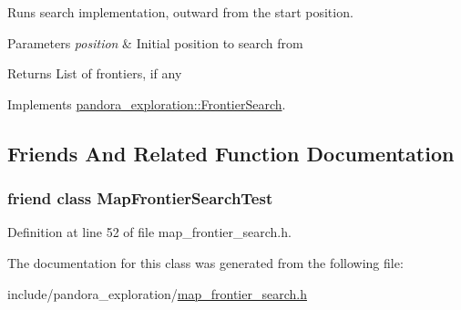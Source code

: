 \-Runs search implementation, outward from the start position. 


\begin{DoxyParams}{\-Parameters}
{\em position} & \-Initial position to search from \\
\hline
\end{DoxyParams}
\begin{DoxyReturn}{\-Returns}
\-List of frontiers, if any 
\end{DoxyReturn}


\-Implements \hyperlink{classpandora__exploration_1_1_frontier_search_ab5229aa64c1876a50f55d7c84e961cf8}{pandora\-\_\-exploration\-::\-Frontier\-Search}.



\subsection{\-Friends \-And \-Related \-Function \-Documentation}
\hypertarget{classpandora__exploration_1_1_map_frontier_search_a70b63bda669585bd36090d1655f87613}{
\subsubsection[{\-Map\-Frontier\-Search\-Test}]{\setlength{\rightskip}{0pt plus 5cm}friend class {\bf \-Map\-Frontier\-Search\-Test}}}\label{classpandora__exploration_1_1_map_frontier_search_a70b63bda669585bd36090d1655f87613}


\-Definition at line 52 of file map\-\_\-frontier\-\_\-search.\-h.



\-The documentation for this class was generated from the following file\-:\begin{DoxyCompactItemize}
\item 
include/pandora\-\_\-exploration/\hyperlink{map__frontier__search_8h}{map\-\_\-frontier\-\_\-search.\-h}\end{DoxyCompactItemize}
